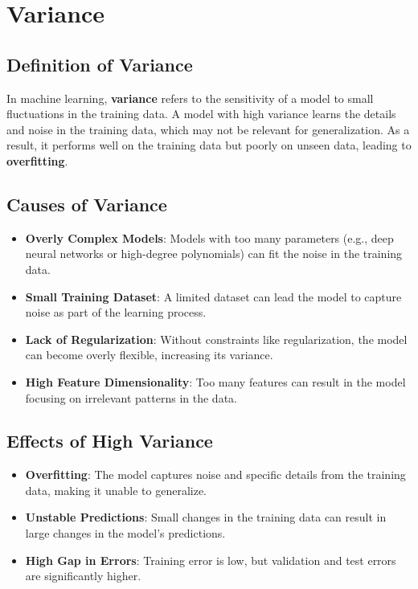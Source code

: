 \section{Variance}

\subsection*{Definition of Variance}
In machine learning, \textbf{variance} refers to the sensitivity of a model to small fluctuations in the training data. A model with high variance learns the details and noise in the training data, which may not be relevant for generalization. As a result, it performs well on the training data but poorly on unseen data, leading to \textbf{overfitting}.

\subsection*{Causes of Variance}

\begin{itemize}
    \item \textbf{Overly Complex Models}: Models with too many parameters (e.g., deep neural networks or high-degree polynomials) can fit the noise in the training data.
    \item \textbf{Small Training Dataset}: A limited dataset can lead the model to capture noise as part of the learning process.
    \item \textbf{Lack of Regularization}: Without constraints like regularization, the model can become overly flexible, increasing its variance.
    \item \textbf{High Feature Dimensionality}: Too many features can result in the model focusing on irrelevant patterns in the data.
\end{itemize}

\subsection*{Effects of High Variance}
\begin{itemize}
    \item \textbf{Overfitting}: The model captures noise and specific details from the training data, making it unable to generalize.
    \item \textbf{Unstable Predictions}: Small changes in the training data can result in large changes in the model's predictions.
    \item \textbf{High Gap in Errors}: Training error is low, but validation and test errors are significantly higher.
\end{itemize}

